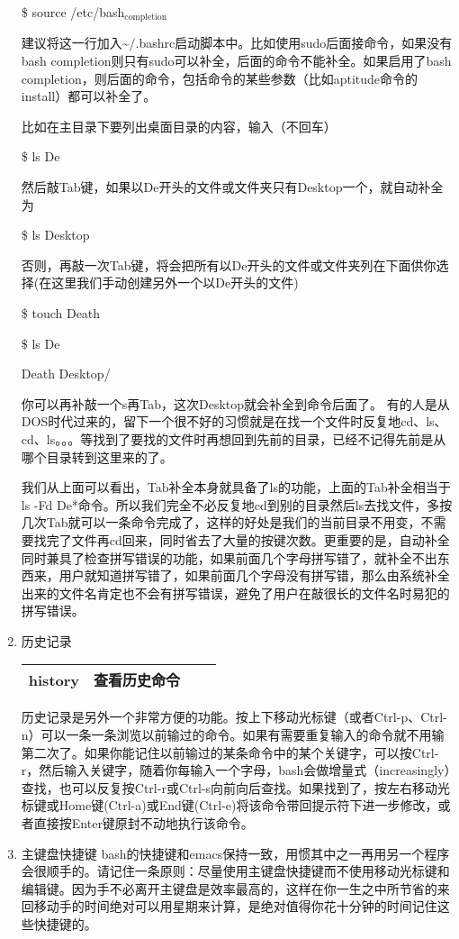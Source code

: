 \documentclass[11pt]{article}
\begin{document}
\begin{enumerate}
\$ source /etc/bash$_{\text{completion}}$

建议将这一行加入\textasciitilde{}/.bashrc启动脚本中。比如使用sudo后面接命令，如果没有bash completion则只有sudo可以补全，后面的命令不能补全。如果启用了bash completion，则后面的命令，包括命令的某些参数（比如aptitude命令的install）都可以补全了。 

比如在主目录下要列出桌面目录的内容，输入（不回车） 

\$ ls De

然后敲Tab键，如果以De开头的文件或文件夹只有Desktop一个，就自动补全为 

\$ ls Desktop

否则，再敲一次Tab键，将会把所有以De开头的文件或文件夹列在下面供你选择(在这里我们手动创建另外一个以De开头的文件) 

\$ touch Death

\$ ls De

Death    Desktop/

你可以再补敲一个s再Tab，这次Desktop就会补全到命令后面了。 
有的人是从DOS时代过来的，留下一个很不好的习惯就是在找一个文件时反复地cd、ls、cd、ls。。。等找到了要找的文件时再想回到先前的目录，已经不记得先前是从哪个目录转到这里来的了。 

我们从上面可以看出，Tab补全本身就具备了ls的功能，上面的Tab补全相当于ls -Fd De*命令。所以我们完全不必反复地cd到别的目录然后ls去找文件，多按几次Tab就可以一条命令完成了，这样的好处是我们的当前目录不用变，不需要找完了文件再cd回来，同时省去了大量的按键次数。更重要的是，自动补全同时兼具了检查拼写错误的功能，如果前面几个字母拼写错了，就补全不出东西来，用户就知道拼写错了，如果前面几个字母没有拼写错，那么由系统补全出来的文件名肯定也不会有拼写错误，避免了用户在敲很长的文件名时易犯的拼写错误。 
\item 历史记录
\label{sec-1-1-1-4}
\begin{center}
\begin{tabular}{llll}
history & 查看历史命令 &  & \\
\hline
\end{tabular}
\end{center}

历史记录是另外一个非常方便的功能。按上下移动光标键（或者Ctrl-p、Ctrl-n）可以一条一条浏览以前输过的命令。如果有需要重复输入的命令就不用输第二次了。如果你能记住以前输过的某条命令中的某个关键字，可以按Ctrl-r，然后输入关键字，随着你每输入一个字母，bash会做增量式（increasingly）查找，也可以反复按Ctrl-r或Ctrl-s向前向后查找。如果找到了，按左右移动光标键或Home键(Ctrl-a)或End键(Ctrl-e)将该命令带回提示符下进一步修改，或者直接按Enter键原封不动地执行该命令。 
\item 主键盘快捷键
\label{sec-1-1-1-5}
bash的快捷键和emacs保持一致，用惯其中之一再用另一个程序会很顺手的。请记住一条原则：尽量使用主键盘快捷键而不使用移动光标键和编辑键。因为手不必离开主键盘是效率最高的，这样在你一生之中所节省的来回移动手的时间绝对可以用星期来计算，是绝对值得你花十分钟的时间记住这些快捷键的。


\end{enumerate}
\end{document}
